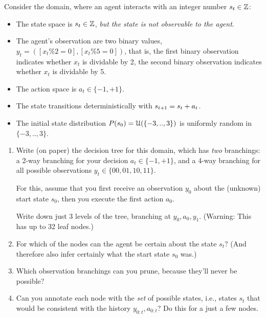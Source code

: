 

\renewcommand{\course}{Artificial Intelligence}
\renewcommand{\coursepicture}{course_ai}
\renewcommand{\coursedate}{Summer 2023}

\renewcommand{\exnum}{Exercise 3}

\exercises
\exercisestitle



Consider the domain, where an agent interacts with an integer number
$s_t \in{\mathbb{Z}}$:
\begin{itemize}
\item The state space is $s_t \in {\mathbb{Z}}$, \emph{but the state is not observable
  to the agent}.
\item The agent's observation are two binary values, $y_t = ([x_t \% 2=0],
  [x_t\%5 = 0])$, that is, the first binary observation indicates
  whether $x_t$ is dividable by 2, the second binary observation
  indicates whether $x_t$ is dividable by 5.
\item The action space is $a_t \in\{-1, +1\}$.
\item The state transitions deterministically with $s_{t{{\hspace*{-.0pt}\text{\rm +}\hspace*{-.5pt}}1}} = s_t + a_t$.
\item The initial state distribution $P(s_0) = {\cal U}(\{-3,..,3\})$
is uniformly random in $\{-3,..,3\}$.
\end{itemize}

\begin{enumerate}
\item Write (on paper) the decision tree for this domain, which has \emph{two} branchings: a 2-way branching for your decision $a_t\in\{-1,+1\}$, and a 4-way branching for all possible observations $y_t\in\{00,01,10,11\}$.

For this, assume that you first receive an observation $y_0$ about the (unknown) start state $s_0$, then you execute the first action $a_0$.

Write down just 3 levels of the tree, branching at $y_0,a_0,y_1$. (Warning: This has up to 32 leaf nodes.)

\item For which of the nodes can the agent be certain about the state $s_t$? (And therefore also infer certainly what the start state $s_0$ was.)

\item Which observation branchings can you prune, because they'll never be possible?

\item Can you annotate each node with the \emph{set} of possible states, i.e., states $s_t$ that would be consistent with the history $y_{0:t},a_{0:t}$? Do this for a just a few nodes.
\end{enumerate}

